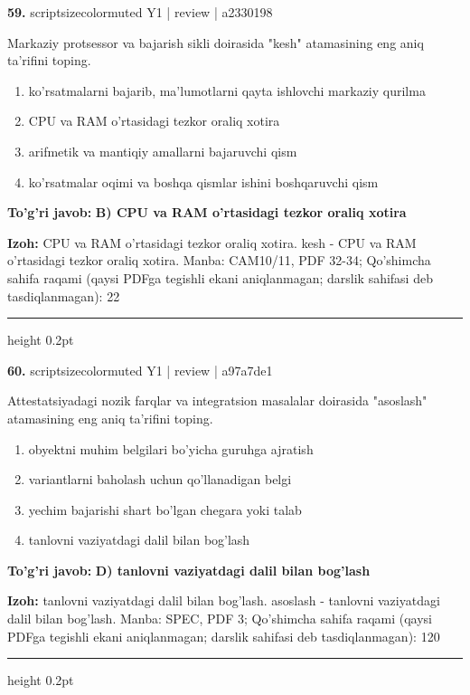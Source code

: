 \documentclass[10pt,a4paper]{article}
\begin{document}
{\bfseries\sffamily\color{ink} 59.} {scriptsizecolor{muted} Y1 | review | a2330198}
\par
Markaziy protsessor va bajarish sikli doirasida "kesh" atamasining eng aniq ta'rifini toping.
\begin{enumerate}[label=\Alph*),leftmargin=9mm]
\item ko'rsatmalarni bajarib, ma'lumotlarni qayta ishlovchi markaziy qurilma
\item CPU va RAM o'rtasidagi tezkor oraliq xotira
\item arifmetik va mantiqiy amallarni bajaruvchi qism
\item ko'rsatmalar oqimi va boshqa qismlar ishini boshqaruvchi qism
\end{enumerate}
\begin{tcolorbox}[enhanced,breakable,colback=teal!4,colframe=teal!60!black,boxrule=0.45pt,arc=1.2mm,left=2.7mm,right=2.7mm,top=1.8mm,bottom=1.8mm,before skip=2mm,after skip=2mm]
{\bfseries\sffamily\color{teal}To'g'ri javob:} \textbf{B) CPU va RAM o'rtasidagi tezkor oraliq xotira}
\par\smallskip
{\bfseries Izoh:} CPU va RAM o'rtasidagi tezkor oraliq xotira. kesh - CPU va RAM o'rtasidagi tezkor oraliq xotira. Manba: CAM10/11, PDF 32-34; Qo'shimcha sahifa raqami (qaysi PDFga tegishli ekani aniqlanmagan; darslik sahifasi deb tasdiqlanmagan): 22
\end{tcolorbox}
\vspace{2mm}\hrule height 0.2pt\vspace{3mm}

{\bfseries\sffamily\color{ink} 60.} {scriptsizecolor{muted} Y1 | review | a97a7de1}
\par
Attestatsiyadagi nozik farqlar va integratsion masalalar doirasida "asoslash" atamasining eng aniq ta'rifini toping.
\begin{enumerate}[label=\Alph*),leftmargin=9mm]
\item obyektni muhim belgilari bo'yicha guruhga ajratish
\item variantlarni baholash uchun qo'llanadigan belgi
\item yechim bajarishi shart bo'lgan chegara yoki talab
\item tanlovni vaziyatdagi dalil bilan bog'lash
\end{enumerate}
\begin{tcolorbox}[enhanced,breakable,colback=teal!4,colframe=teal!60!black,boxrule=0.45pt,arc=1.2mm,left=2.7mm,right=2.7mm,top=1.8mm,bottom=1.8mm,before skip=2mm,after skip=2mm]
{\bfseries\sffamily\color{teal}To'g'ri javob:} \textbf{D) tanlovni vaziyatdagi dalil bilan bog'lash}
\par\smallskip
{\bfseries Izoh:} tanlovni vaziyatdagi dalil bilan bog'lash. asoslash - tanlovni vaziyatdagi dalil bilan bog'lash. Manba: SPEC, PDF 3; Qo'shimcha sahifa raqami (qaysi PDFga tegishli ekani aniqlanmagan; darslik sahifasi deb tasdiqlanmagan): 120
\end{tcolorbox}
\vspace{2mm}\hrule height 0.2pt\vspace{3mm}
\end{document}

